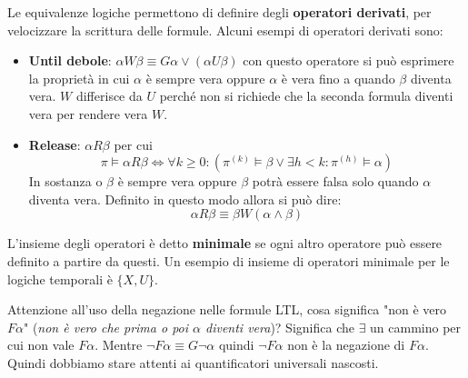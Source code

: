Le equivalenze logiche permettono di definire degli \textbf{operatori derivati},
per velocizzare la scrittura delle formule. Alcuni esempi di operatori derivati
sono:
\begin{itemize}
    \item \textbf{Until debole}: $\alpha W \beta \equiv G\alpha \lor
              (\alpha U \beta)$ con questo operatore si può esprimere la proprietà
          in cui $\alpha$ è sempre vera oppure $\alpha$ è vera fino a quando
          $\beta$ diventa vera. $W$ differisce da $U$ perché non si richiede che
          la seconda formula diventi vera per rendere vera $W$.
    \item \textbf{Release}: $\alpha R \beta$ per cui
          \begin{equation}
              \pi \vDash \alpha R \beta \iff \forall k \geq 0: (\pi^{(k)} \vDash
              \beta \lor \exists h < k: \pi^{(h)} \vDash \alpha)
          \end{equation}
          In sostanza o $\beta$ è sempre vera oppure $\beta$ potrà essere falsa
          solo quando $\alpha$ diventa vera. Definito in questo modo allora si
          può dire:
          \begin{equation}
              \alpha R \beta \equiv \beta W (\alpha \land \beta)
          \end{equation}
\end{itemize}
\begin{definizione}
    L'insieme degli operatori è detto \textbf{minimale} se ogni altro
    operatore può essere definito a partire da questi. Un esempio di insieme di
    operatori minimale per le logiche temporali è $\{X,U\}$.
\end{definizione}
Attenzione all'uso della negazione nelle formule LTL, cosa significa "non è vero
$F\alpha$" (\textit{non è vero che prima o poi $\alpha$ diventi vera})? Significa
che $\exists$ un cammino per cui non vale $F\alpha$. Mentre $\lnot F\alpha \equiv
    G\lnot \alpha$ quindi $\lnot F\alpha$ non è la negazione di $F\alpha$. Quindi
dobbiamo stare attenti ai quantificatori universali nascosti.

